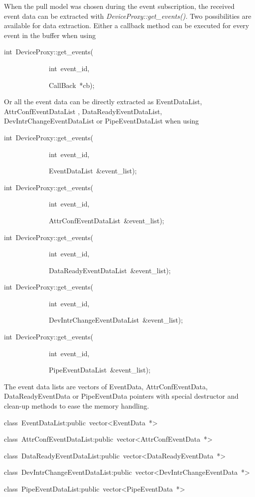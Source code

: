 When the pull model was chosen during the event subscription, the
received event data can be extracted with \emph{DeviceProxy::get\_events().}
Two possibilities are available for data extraction. Either a callback
method can be executed for every event in the buffer when using
\begin{lyxcode}
int~DeviceProxy::get\_events(~

~~~~~~~~~~~~~int~event\_id,~

~~~~~~~~~~~~~CallBack~{*}cb);
\end{lyxcode}
Or all the event data can be directly extracted as EventDataList,
AttrConfEventDataList , DataReadyEventDataList,
DevIntrChangeEventDataList or PipeEventDataList
when using
\begin{lyxcode}
int~DeviceProxy::get\_events(~

~~~~~~~~~~~~~int~event\_id,~

~~~~~~~~~~~~~EventDataList~\&event\_list);

int~DeviceProxy::get\_events(~

~~~~~~~~~~~~~int~event\_id,~

~~~~~~~~~~~~~AttrConfEventDataList~\&event\_list);

int~DeviceProxy::get\_events(~

~~~~~~~~~~~~~int~event\_id,~

~~~~~~~~~~~~~DataReadyEventDataList~\&event\_list);

int~DeviceProxy::get\_events(~

~~~~~~~~~~~~~int~event\_id,~

~~~~~~~~~~~~~DevIntrChangeEventDataList~\&event\_list);

int~DeviceProxy::get\_events(~

~~~~~~~~~~~~~int~event\_id,~

~~~~~~~~~~~~~PipeEventDataList~\&event\_list);
\end{lyxcode}
The event data lists are vectors of EventData, AttrConfEventData,
DataReadyEventData or PipeEventData pointers with special destructor
and clean-up methods to ease the memory handling.
\begin{lyxcode}
class~EventDataList:public~vector<EventData~{*}>

class~AttrConfEventDataList:public~vector<AttrConfEventData~{*}>

class~DataReadyEventDataList:public~vector<DataReadyEventData~{*}>

class~DevIntrChangeEventDataList:public~vector<DevIntrChangeEventData~{*}>

class~PipeEventDataList:public~vector<PipeEventData~{*}>
\end{lyxcode}


